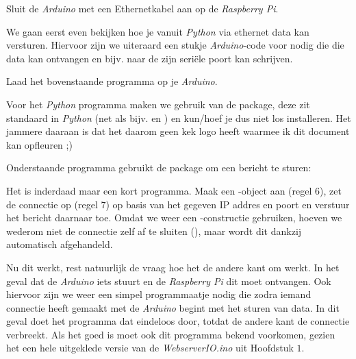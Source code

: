 \begin{exercise}
Sluit de \textit{Arduino} met een Ethernetkabel aan op de \textit{Raspberry Pi}.
\end{exercise}

We gaan eerst even bekijken hoe je vanuit \textit{Python} via ethernet data kan versturen. Hiervoor zijn we uiteraard een stukje \textit{Arduino}-code voor nodig die die data kan ontvangen en bijv. naar de zijn seriële poort kan schrijven.



\begin{exercise}
Laad het bovenstaande programma op je \textit{Arduino}. 
\end{exercise}

Voor het \textit{Python} programma maken we gebruik van de  package, deze zit standaard in \textit{Python} (net als bijv.  en ) en kun/hoef je dus niet los installeren. Het jammere daaraan is dat het daarom geen kek logo heeft waarmee ik dit document kan opfleuren ;) \newline

Onderstaande programma gebruikt de  package om een bericht te sturen:

Het is inderdaad maar een kort programma. Maak een -object aan (regel $6$), zet de connectie op (regel $7$) op basis van het gegeven IP addres en poort en verstuur het bericht daarnaar toe. Omdat we weer een -constructie gebruiken, hoeven we wederom niet de connectie zelf af te sluiten (), maar wordt dit dankzij  automatisch afgehandeld. \newline \newline

Nu dit werkt, rest natuurlijk de vraag hoe het de andere kant om werkt. In het geval dat de \textit{Arduino} iets stuurt en de \textit{Raspberry Pi} dit moet ontvangen. Ook hiervoor zijn we weer een simpel programmaatje nodig die zodra iemand connectie heeft gemaakt met de \textit{Arduino} begint met het sturen van data. In dit geval doet het programma dat eindeloos door, totdat de andere kant de connectie verbreekt. Als het goed is moet ook dit programma bekend voorkomen, gezien het een hele uitgeklede versie van de \textit{WebserverIO.ino} uit Hoofdstuk $1$.


